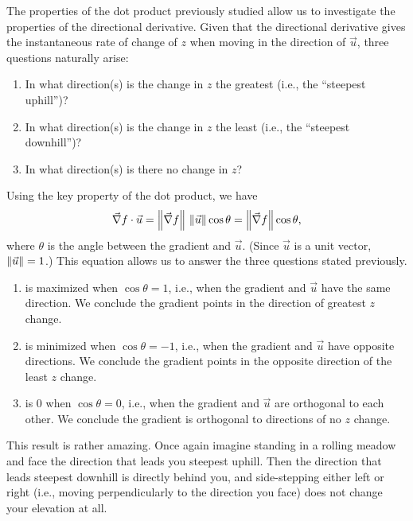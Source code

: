 The properties of the dot product previously studied allow us to investigate the properties of the directional derivative. Given that the directional derivative gives the instantaneous rate of change of $z$ when moving in the direction of $\vec u$, three questions naturally arise:
\begin{enumerate}
	\item In what direction(s) is the change in $z$ the greatest (i.e., the ``steepest uphill'')?
	\item In what direction(s) is the change in $z$ the least (i.e.,  the ``steepest downhill'')?
	\item In what direction(s) is there no change in $z$?
\end{enumerate}

Using the key property of the dot product, we have
\begin{equation}
\vec\nabla f\cdot \vec u = \left\lVert \vec\nabla f \right\rVert\,\left\lVert \vec u \right\rVert \cos \theta = \left\lVert \vec\nabla f \right\rVert\cos \theta, \label{eq:gradient}
\end{equation}
where $\theta$ is the angle between the gradient and $\vec u$. (Since $\vec u$ is a unit vector, $\left\lVert \vec u \right\rVert = 1$.) This equation allows us to answer the three questions stated previously.
\begin{enumerate}
	\item {} is maximized when $\cos \theta =1$, i.e., when the gradient and $\vec u$ have the same direction. We conclude the gradient points in the direction of greatest $z$ change.
	\item	{} is minimized when $\cos \theta = -1$, i.e., when the gradient and $\vec u$ have opposite directions. We conclude the gradient points in the opposite direction of the least $z$ change.
	\item {} is 0 when $\cos \theta = 0$, i.e., when the gradient and $\vec u$ are orthogonal to each other. We conclude the gradient is orthogonal to directions of no $z$ change. 
\end{enumerate}

This result is rather amazing. Once again imagine standing in a rolling meadow and face the  direction that leads you steepest uphill. Then the direction that leads steepest downhill is directly behind you, and side-stepping either left or right (i.e., moving perpendicularly to the direction you face) does not change your elevation at all.


